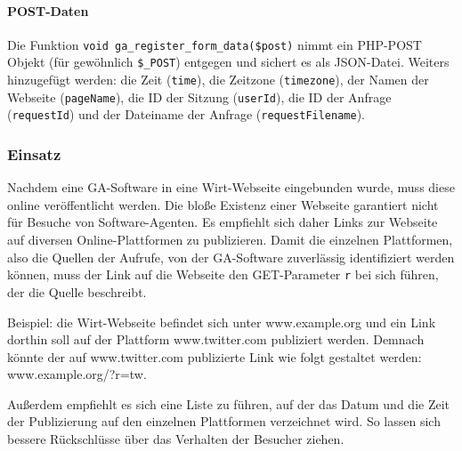 \paragraph{POST-Daten}
\label{par:ga_post_daten}
Die Funktion \texttt{void\ ga\_register\_form\_data(\$post)} nimmt ein PHP-POST
Objekt (für gewöhnlich \texttt{\$\_POST}) entgegen und sichert es als
JSON-Datei. Weiters hinzugefügt werden: die Zeit (\texttt{time}), die Zeitzone
(\texttt{timezone}), der Namen der Webseite (\texttt{pageName}), die ID der
Sitzung (\texttt{userId}), die ID der Anfrage (\texttt{requestId}) und der
Dateiname der Anfrage (\texttt{requestFilename}).

\subsubsection{Einsatz}
\label{ssub:ga_einsatz}
Nachdem eine GA-Software in eine Wirt-Webseite eingebunden wurde, muss diese
online veröffentlicht werden. Die bloße Existenz einer Webseite garantiert
nicht für Besuche von Software-Agenten. Es empfiehlt sich daher Links zur
Webseite auf diversen Online-Plattformen zu publizieren. Damit die einzelnen
Plattformen, also die Quellen der Aufrufe, von der GA-Software zuverlässig
identifiziert werden können, muss der Link auf die Webseite den GET-Parameter
\texttt{r} bei sich führen, der die Quelle beschreibt.

Beispiel: die Wirt-Webseite befindet sich unter www.example.org und ein Link
dorthin soll auf der Plattform www.twitter.com publiziert werden. Demnach
könnte der auf www.twitter.com publizierte Link wie folgt gestaltet werden:
www.example.org/?r=tw.

Außerdem empfiehlt es sich eine Liste zu führen, auf der das Datum und die Zeit
der Publizierung auf den einzelnen Plattformen verzeichnet wird. So lassen sich
bessere Rückschlüsse über das Verhalten der Besucher ziehen.
